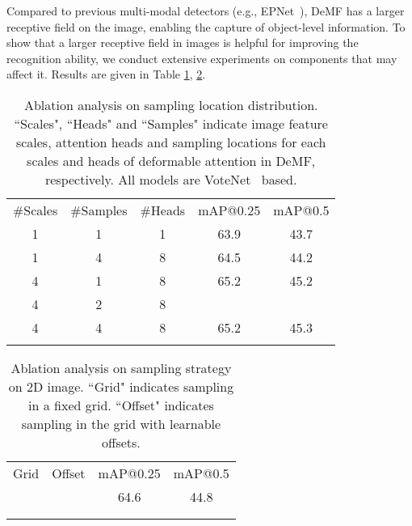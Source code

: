 \documentclass[runningheads]{llncs}
\begin{document}
Compared to previous multi-modal detectors (e.g., EPNet~\cite{10.1007/978-3-030-58555-6_3}), DeMF has a larger receptive field on the image, enabling the capture of object-level information. To show that a larger receptive field in images is helpful for improving the recognition ability, we conduct extensive experiments on components that may affect it. Results are given in Table \ref{table:receptive-field-deform-param}, \ref{table:receptive-field-deform-sample}.

\setlength{\tabcolsep}{6pt}
\begin{table}[t]
\begin{center}
\caption{Ablation analysis on sampling location distribution. ``Scales", ``Heads" and ``Samples" indicate image feature scales, attention heads and sampling locations for each scales and heads of deformable attention in DeMF, respectively. All models are VoteNet~\cite{qi2019deep} based.}
\vspace{6pt}
\label{table:receptive-field-deform-param}
    \centering
        \begin{tabular}{ccccc}
        \Xhline{0.8pt}\noalign{\smallskip}
        \#Scales & \#Samples &\#Heads &mAP@0.25& mAP@0.5 \\
        \noalign{\smallskip}
        \hline
        \noalign{\smallskip}
         1 & 1 & 1 & 63.9 & 43.7 \\
         1 & 4 & 8 & 64.5 & 44.2 \\
         4 & 1 & 8 & 65.2 & 45.2 \\
         4 & 2 & 8 &  &  \\
         4 & 4 & 8 & 65.2 & 45.3 \\
         \Xhline{0.8pt}
        \end{tabular}
\end{center}
\end{table}
\setlength{\tabcolsep}{1.4pt}

\setlength{\tabcolsep}{6pt}
\begin{table}[t]
\begin{center}
\vspace{-20pt}
\caption{Ablation analysis on sampling strategy on 2D image. ``Grid" indicates sampling in a fixed grid. ``Offset" indicates sampling in the grid with learnable offsets.}
\vspace{6pt}
\label{table:receptive-field-deform-sample}
    \centering
        \begin{tabular}{cccc}
        \Xhline{0.8pt}\noalign{\smallskip}
        Grid & Offset &mAP@0.25  & mAP@0.5 \\
        \noalign{\smallskip}
        \hline
        \noalign{\smallskip}
        &   & 64.6 & 44.8 \\
        &  &  &  \\
        \Xhline{0.8pt}
        \end{tabular}
\end{center}
\end{table}
\setlength{\tabcolsep}{1.4pt}
\end{document}
